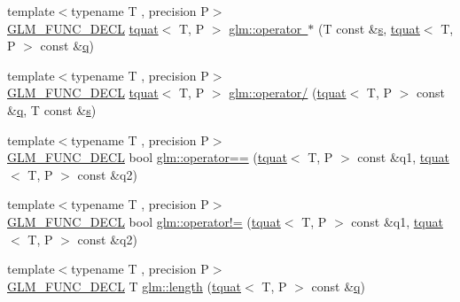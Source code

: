 \begin{DoxyCompactItemize}
\item 
{\footnotesize template$<$typename T , precision P$>$ }\\\mbox{\hyperlink{setup_8hpp_ab2d052de21a70539923e9bcbf6e83a51}{G\+L\+M\+\_\+\+F\+U\+N\+C\+\_\+\+D\+E\+CL}} \mbox{\hyperlink{structglm_1_1tquat}{tquat}}$<$ T, P $>$ \mbox{\hyperlink{group__gtc__quaternion_ga75ae9786475c53c29b719174cb5c38f4}{glm\+::operator $\ast$}} (T const \&\mbox{\hyperlink{glad_8h_af1b1d5edfea6a34daee7389b1b5810ad}{s}}, \mbox{\hyperlink{structglm_1_1tquat}{tquat}}$<$ T, P $>$ const \&\mbox{\hyperlink{glad_8h_a514729309336df22bcc8eda979d6ced4}{q}})
\item 
{\footnotesize template$<$typename T , precision P$>$ }\\\mbox{\hyperlink{setup_8hpp_ab2d052de21a70539923e9bcbf6e83a51}{G\+L\+M\+\_\+\+F\+U\+N\+C\+\_\+\+D\+E\+CL}} \mbox{\hyperlink{structglm_1_1tquat}{tquat}}$<$ T, P $>$ \mbox{\hyperlink{group__gtc__quaternion_gab52fd3ac627908aa2aa1df96ddcdd113}{glm\+::operator/}} (\mbox{\hyperlink{structglm_1_1tquat}{tquat}}$<$ T, P $>$ const \&\mbox{\hyperlink{glad_8h_a514729309336df22bcc8eda979d6ced4}{q}}, T const \&\mbox{\hyperlink{glad_8h_af1b1d5edfea6a34daee7389b1b5810ad}{s}})
\item 
{\footnotesize template$<$typename T , precision P$>$ }\\\mbox{\hyperlink{setup_8hpp_ab2d052de21a70539923e9bcbf6e83a51}{G\+L\+M\+\_\+\+F\+U\+N\+C\+\_\+\+D\+E\+CL}} bool \mbox{\hyperlink{group__gtc__quaternion_ga7070e4e3cfdac395b3392219a365d95b}{glm\+::operator==}} (\mbox{\hyperlink{structglm_1_1tquat}{tquat}}$<$ T, P $>$ const \&q1, \mbox{\hyperlink{structglm_1_1tquat}{tquat}}$<$ T, P $>$ const \&q2)
\item 
{\footnotesize template$<$typename T , precision P$>$ }\\\mbox{\hyperlink{setup_8hpp_ab2d052de21a70539923e9bcbf6e83a51}{G\+L\+M\+\_\+\+F\+U\+N\+C\+\_\+\+D\+E\+CL}} bool \mbox{\hyperlink{group__gtc__quaternion_gacbe1e859eb6558097bac5ec45955c60a}{glm\+::operator!=}} (\mbox{\hyperlink{structglm_1_1tquat}{tquat}}$<$ T, P $>$ const \&q1, \mbox{\hyperlink{structglm_1_1tquat}{tquat}}$<$ T, P $>$ const \&q2)
\item 
{\footnotesize template$<$typename T , precision P$>$ }\\\mbox{\hyperlink{setup_8hpp_ab2d052de21a70539923e9bcbf6e83a51}{G\+L\+M\+\_\+\+F\+U\+N\+C\+\_\+\+D\+E\+CL}} T \mbox{\hyperlink{group__gtc__quaternion_gac682181783027544c8d251b4d3a60cf8}{glm\+::length}} (\mbox{\hyperlink{structglm_1_1tquat}{tquat}}$<$ T, P $>$ const \&\mbox{\hyperlink{glad_8h_a514729309336df22bcc8eda979d6ced4}{q}})

\end{DoxyCompactItemize}
